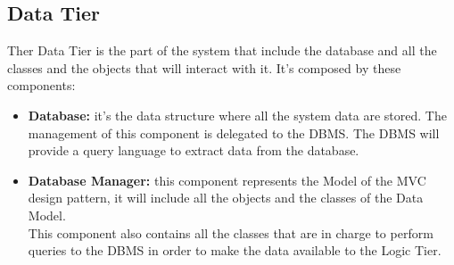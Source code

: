 \documentclass[../../../../../../dd.tex]{subfiles}
\begin{document}
	\subsection{Data Tier}
		Ther Data Tier is the part of the system that include the database and all the classes and the objects that will interact with it.
		It's composed by these components:
		\begin{itemize}
			\item \textbf{Database:} it's the data structure where all the system data are stored. The management of this component is delegated to the DBMS. The DBMS will provide a query language to extract data from the database.
			\item \textbf{Database Manager:} this component represents the Model of the MVC design pattern, it will include all the objects and the classes of the Data Model.\\ This component also contains all the classes that are in charge to perform queries to the DBMS in order to make the data available to the Logic Tier.
		\end{itemize}
	
\end{document}
